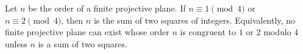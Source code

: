 Let $n$ be the order of a finite projective plane. If $n \equiv 1 \pmod{4}$ or $n \equiv 2 \pmod{4}$, then $n$ is the sum of two squares of integers. Equivalently, no finite projective plane can exist whose order $n$ is congruent to $1$ or $2$ modulo $4$ unless $n$ is a sum of two squares.
